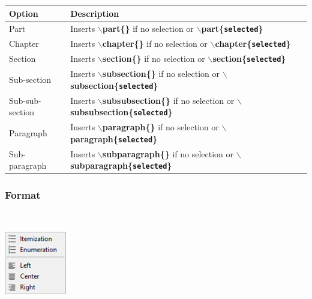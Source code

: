 \begin{scriptsize}
  \begin{tabularx}{\textwidth}{>{\hsize=0.2\hsize}X>{\hsize=0.8\hsize}X}\\
    \hline
    \textbf{Option} & \textbf{Description} \\
    \hline
    Part & Inserts \textbf{$\backslash$part\{\}} if no selection or \textbf{$\backslash$part\{\texttt{selected}\}} \\
    Chapter & Inserts \textbf{$\backslash$chapter\{\}} if no selection or \textbf{$\backslash$chapter\{\texttt{selected}\}} \\
    Section & Inserts \textbf{$\backslash$section\{\}} if no selection or \textbf{$\backslash$section\{\texttt{selected}\}} \\
    Sub-section & Inserts \textbf{$\backslash$subsection\{\}} if no selection or \textbf{$\backslash$subsection\{\texttt{selected}\}} \\
    Sub-sub-section & Inserts \textbf{$\backslash$subsubsection\{\}} if no selection or \textbf{$\backslash$subsubsection\{\texttt{selected}\}} \\
    Paragraph & Inserts \textbf{$\backslash$paragraph\{\}} if no selection or \textbf{$\backslash$paragraph\{\texttt{selected}\}} \\
    Sub-paragraph & Inserts \textbf{$\backslash$subparagraph\{\}} if no selection or \textbf{$\backslash$subparagraph\{\texttt{selected}\}} \\
    \hline
  \end{tabularx}
\end{scriptsize}


\hypertarget{menu_insert_latex_format}{}
\subsubsection{Format}\\

\includegraphics[scale=0.50]{./res/menu_insert_latex_format.png}\\

